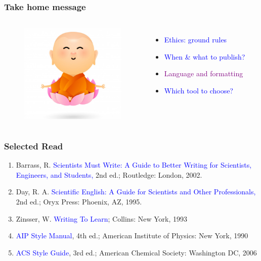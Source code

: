 \documentclass[newPxFont,sthlmFooter]{beamer}
\newcommand{\fs}{\footnotesize}
\begin{document}
\begin{frame}\frametitle{Take home message}
  \begin{columns}[T,onlytextwidth]
  \begin{figure}
    \centering
    \includegraphics[width=2in]{figs/bud} 
  \end{figure}
          \vspace{1.5cm}
  \begin{itemize}
  \fs
	\item \textcolor{blue}{Ethics: ground rules}
	\item \textcolor{blue}{When \& what to publish?}
	\item \textcolor{purple}{Language and formatting}
	\item \textcolor{blue}{Which tool to choose?}
	\end{itemize}
  \vspace{-2cm}
  \end{columns}
\end{frame}

\begin{frame}\frametitle{Selected Read}
  \begin{enumerate}
    \fs
	\item Barrass, R. \textcolor{blue}{Scientists Must Write: A Guide to Better Writing for Scientists, Engineers, and Students,} 2nd ed.; Routledge: London, 2002.
	\item Day, R. A. \textcolor{blue}{Scientific English: A Guide for Scientists and Other Professionals,} 2nd ed.; Oryx Press: Phoenix, AZ, 1995.
	\item Zinsser, W. \textcolor{blue}{Writing To Learn}; Collins: New York, 1993
	\item \textcolor{blue}{AIP Style Manual}, 4th ed.; American Institute of Physics: New York, 1990
	\item \textcolor{blue}{ACS Style Guide}, 3rd ed.; American Chemical Society: Washington DC, 2006
  \end{enumerate}
\end{frame}
\end{document}
